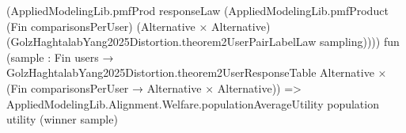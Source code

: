 \documentclass[10pt]{article}
\begin{document}
\begin{ReviewVerbatim}
                                            (AppliedModelingLib.pmfProd responseLaw
                                              (AppliedModelingLib.pmfProduct (Fin comparisonsPerUser)
                                                (Alternative × Alternative)
                                                (GolzHaghtalabYang2025Distortion.theorem2UserPairLabelLaw sampling))))
                                          fun
                                            (sample :
                                              Fin users →
                                                GolzHaghtalabYang2025Distortion.theorem2UserResponseTable Alternative ×
                                                  (Fin comparisonsPerUser → Alternative × Alternative)) =>
                                          AppliedModelingLib.Alignment.Welfare.populationAverageUtility population
                                            utility (winner sample)
\end{ReviewVerbatim}
\end{document}
